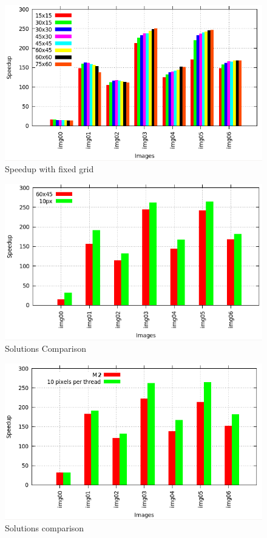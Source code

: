 \documentclass[a4paper]{article}
\begin{document}
\begin{figure}[!ht]
    \centering
    \includegraphics[width=0.8\linewidth]{res/new/darker_fixed}
    \caption{Speedup with fixed grid}
    \label{fig:darker_fixed}
\end{figure}
\FloatBarrier

\begin{figure}[!ht]
    \centering
    \includegraphics[width=0.7\linewidth]{res/new/darker_best_compare}
    \caption{Solutions Comparison}
    \label{fig:compare_darker}
\end{figure}
\FloatBarrier

\begin{figure}[!ht]
    \centering
    \includegraphics[width=0.7\linewidth]{res/new/darker_single_more_comparison}
    \caption{Solutions comparison}
    \label{fig:darker_single_more_comparison}
\end{figure}
\FloatBarrier
\end{document}
